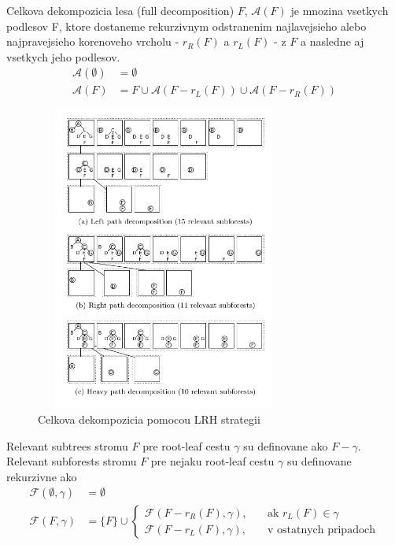 \begin{definice}
	Celkova dekompozicia lesa (full decomposition) $F$, $\mathcal{A}(F)$ je mnozina
	vsetkych podlesov F, ktore dostaneme rekurzivnym odstranenim najlavejsieho
	alebo najpravejsieho korenoveho vrcholu - $r_{R}(F)$ a $r_{L}(F)$ - z $F$
	a nasledne aj vsetkych jeho podlesov.
	\begin{align*}
		\mathcal{A}(\emptyset) &= \emptyset
		\\
		\mathcal{A}(F) &= {F} \cup \mathcal{A}(F - r_{L}(F)) \cup \mathcal{A}(F - r_{R}(F))
	\end{align*}
\end{definice}

\begin{figure}[H]
\centering
\includegraphics[width=85mm, height=100mm]{../img/LRH_decomposition.png}
\caption{Celkova dekompozicia pomocou LRH strategii}
\label{obr:LRH_decomposition}
\end{figure}

\begin{definice}
	Relevant subtrees stromu $F$ pre root-leaf cestu $\gamma$ su definovane ako $F - \gamma$.
	Relevant subforests stromu $F$ pre nejaku root-leaf cestu $\gamma$ su definovane rekurzivne ako
	\begin{align*}
    \mathcal{F}(\emptyset, \gamma) &= \emptyset
		\\
		\mathcal{F}(F, \gamma) &= \{F\} \cup
		\begin{cases}
      \mathcal{F}(F - r_{R}(F), \gamma), \quad{} &\text{ak $r_{L}(F) \in \gamma$}
			\\
      \mathcal{F}(F - r_{L}(F), \gamma), &\text{v ostatnych pripadoch}
		\end{cases}
	\end{align*}
\end{definice}

